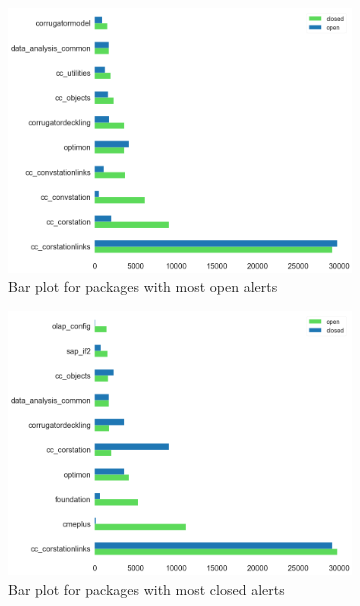 \begin{figure}[H]
	\begin{subfigure}{0.5\textwidth}
		\centering
		\includegraphics[scale=0.2]{./src/data_analysis/most_open_packages.png}
		\caption{Bar plot for packages with most open alerts}
	\end{subfigure}%
	\begin{subfigure}{0.5\textwidth}
		\centering
		\includegraphics[scale=0.2]{./src/data_analysis/most_closed_packages.png}
		\caption{Bar plot for packages with most closed alerts}
	\end{subfigure}
	\caption{}
	\label{most_open_packages}
\end{figure}

